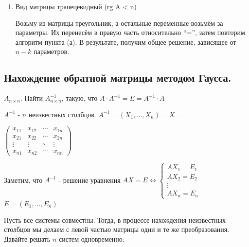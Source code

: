 \begin{enumerate}
\begin{enumerate}
                    Значит \(
                    \begin{pmatrix}
                        b_1'   \\
                        b_2'   \\
                        \vdots \\
                        b_n'
                    \end{pmatrix}
                    \) --- решение СЛАУ, причём единственное в силу теоремы о структуре общего решения СЛНУ.


              \item Вид матрицы трапецевидный (rg A < n)

                    Возьму из матрицы треугольник, а остальные переменные возьмём за параметры. Их перенесём в правую часть относительно ``='', затем повторим алгоритм пункта (а). В результате, получим общее решение, зависящее от $n-k$ параметров.
          \end{enumerate}
\end{enumerate}

\subsection{Нахождение обратной матрицы методом Гаусса.}

\(A_{n \times n}\). Найти \(A^{-1}_{n\times n}\), такую, что \(A \cdot A^{-1} = E = A^{-1}\cdot A\)

\(A^{-1}\) - \(n\) неизвестных столбцов. \(A^{-1} =(X_1,\ldots, X_n) = X =\) 

\(
\begin{pmatrix}
    x_{11} & x_{12} & \cdots & x_{1n} \\
    x_{21} & x_{22} & \cdots & x_{2n} \\
    \vdots & \vdots & \ddots & \vdots \\
    x_{n1} & x_{n2} & \cdots & x_{nn}
\end{pmatrix}
\)

Заметим, что \(A^{-1}\) - решение уравнения
\(AX = E \Leftrightarrow
\begin{cases}
    AX_1 = E_1 \\
    AX_2 = E_2 \\
    \vdots     \\
    AX_n = E_n
\end{cases}
\)
$E = (E_1, \dots, E_n)$

Пусть все системы совместны. Тогда, в процессе нахождения неизвестных столбцов мы делаем с левой частью матрицы одни и те же преобразования. Давайте решать \(n\) систем одновременно:

